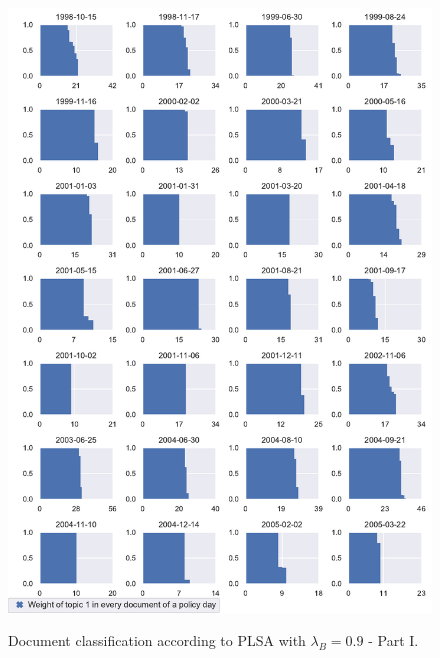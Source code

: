 \documentclass[11pt,a4paper,english,oneside]{book}
\numberwithin{equation}{chapter}
\begin{document}
\begin{figure}
	\caption{Document classification according to PLSA with $\lambda_B = 0.9$ - Part I.}
	\centering
	\includegraphics[scale=0.8]{Images/docsplit01_bgLamb_0_9.pdf}
	\label{classdoc01L09}
\end{figure}
\end{document}
